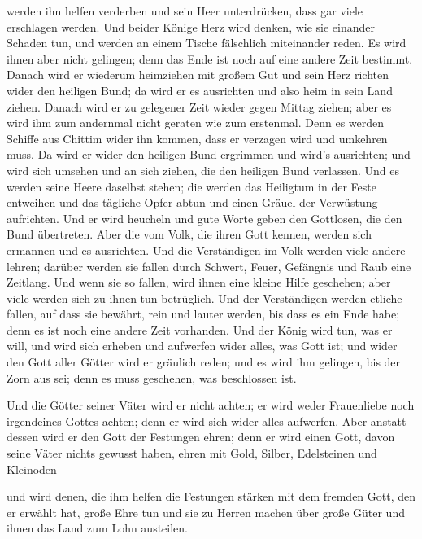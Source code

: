werden ihn helfen verderben und sein Heer unterdrücken, dass gar viele
erschlagen werden.  Und beider Könige Herz wird denken,
wie sie einander Schaden tun, und werden an einem Tische fälschlich
miteinander reden. Es wird ihnen aber nicht gelingen; denn das Ende ist
noch auf eine andere Zeit bestimmt.  Danach wird er
wiederum heimziehen mit großem Gut und sein Herz richten wider den
heiligen Bund; da wird er es ausrichten und also heim in sein Land
ziehen.  Danach wird er zu gelegener Zeit wieder gegen
Mittag ziehen; aber es wird ihm zum andernmal nicht geraten wie zum
erstenmal.  Denn es werden Schiffe aus Chittim wider ihn
kommen, dass er verzagen wird und umkehren muss. Da wird er wider den
heiligen Bund ergrimmen und wird's ausrichten; und wird sich umsehen und
an sich ziehen, die den heiligen Bund verlassen.  Und es
werden seine Heere daselbst stehen; die werden das Heiligtum in der
Feste entweihen und das tägliche Opfer abtun und einen Gräuel der
Verwüstung aufrichten.  Und er wird heucheln und gute
Worte geben den Gottlosen, die den Bund übertreten. Aber die vom Volk,
die ihren Gott kennen, werden sich ermannen und es ausrichten.
 Und die Verständigen im Volk werden viele andere lehren;
darüber werden sie fallen durch Schwert, Feuer, Gefängnis und Raub eine
Zeitlang.  Und wenn sie so fallen, wird ihnen eine kleine
Hilfe geschehen; aber viele werden sich zu ihnen tun betrüglich.
 Und der Verständigen werden etliche fallen, auf dass sie
bewährt, rein und lauter werden, bis dass es ein Ende habe; denn es ist
noch eine andere Zeit vorhanden.  Und der König wird tun,
was er will, und wird sich erheben und aufwerfen wider alles, was Gott
ist; und wider den Gott aller Götter wird er gräulich reden; und es wird
ihm gelingen, bis der Zorn aus sei; denn es muss geschehen, was
beschlossen ist.

 Und die Götter seiner Väter wird er nicht achten; er
wird weder Frauenliebe noch irgendeines Gottes achten; denn er wird sich
wider alles aufwerfen.  Aber anstatt dessen wird er den
Gott der Festungen ehren; denn er wird einen Gott, davon seine Väter
nichts gewusst haben, ehren mit Gold, Silber, Edelsteinen und Kleinoden

 und wird denen, die ihm helfen die Festungen stärken mit
dem fremden Gott, den er erwählt hat, große Ehre tun und sie zu Herren
machen über große Güter und ihnen das Land zum Lohn austeilen.

